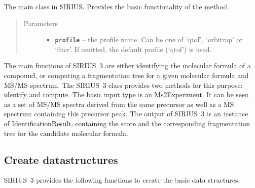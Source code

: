 \documentclass[letterpaper,10pt,openany,oneside]{sphinxmanual}
\begin{document}
\begin{fulllineitems}
\label{library:de.unijena.bioinf.sirius.SIRIUS}
The main class in SIRIUS. Provides the basic functionality of the method.
\begin{quote}\begin{description}
\item[{Parameters}] \leavevmode\begin{itemize}
\item {} 
\textbf{\texttt{profile}} -- the profile name. Can be one of `qtof', `orbitrap' or `fticr'. If omitted, the default profile (`qtof') is used.

\end{itemize}

\end{description}\end{quote}

\end{fulllineitems}

The main functions of SIRIUS~3 are either identifying the molecular formula
of a compound, or computing a fragmentation tree for a given molecular formula
and MS/MS spectrum. The SIRIUS~3 class provides two methods for this purpose:
identify and compute. The basic input type is an Ms2Experiment. It can be
seen as a set of MS/MS spectra derived from the same precursor as well as a
MS spectrum containing this precursor peak. The output of SIRIUS~3 is an
instance of IdentificationResult, containing the score and the corresponding
fragmentation tree for the candidate molecular formula.


\subsection{Create datastructures}
\label{library:create-datastructures}
SIRIUS~3 provides the following functions to create the basic data structures:
\end{document}

